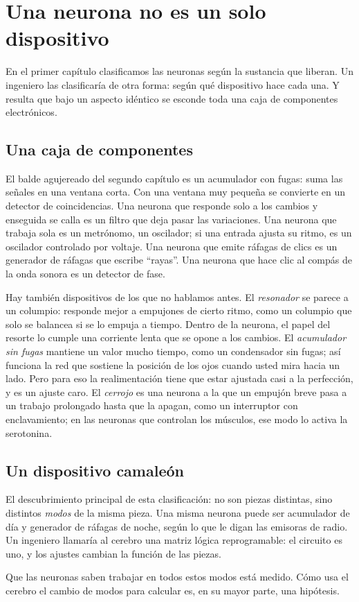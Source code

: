 \chapter{Una neurona no es un solo dispositivo}

En el primer capítulo clasificamos las neuronas según la sustancia que liberan. Un ingeniero las clasificaría de otra forma: según qué dispositivo hace cada una. Y resulta que bajo un aspecto idéntico se esconde toda una caja de componentes electrónicos.

\section*{Una caja de componentes}

El balde agujereado del segundo capítulo es un acumulador con fugas: suma las señales en una ventana corta. Con una ventana muy pequeña se convierte en un detector de coincidencias. Una neurona que responde solo a los cambios y enseguida se calla es un filtro que deja pasar las variaciones. Una neurona que trabaja sola es un metrónomo, un oscilador; si una entrada ajusta su ritmo, es un oscilador controlado por voltaje. Una neurona que emite ráfagas de clics es un generador de ráfagas que escribe “rayas”. Una neurona que hace clic al compás de la onda sonora es un detector de fase.


Hay también dispositivos de los que no hablamos antes. El \emph{resonador} se parece a un columpio: responde mejor a empujones de cierto ritmo, como un columpio que solo se balancea si se lo empuja a tiempo. Dentro de la neurona, el papel del resorte lo cumple una corriente lenta que se opone a los cambios. El \emph{acumulador sin fugas} mantiene un valor mucho tiempo, como un condensador sin fugas; así funciona la red que sostiene la posición de los ojos cuando usted mira hacia un lado. Pero para eso la realimentación tiene que estar ajustada casi a la perfección, y es un ajuste caro. El \emph{cerrojo} es una neurona a la que un empujón breve pasa a un trabajo prolongado hasta que la apagan, como un interruptor con enclavamiento; en las neuronas que controlan los músculos, ese modo lo activa la serotonina.

\section*{Un dispositivo camaleón}

El descubrimiento principal de esta clasificación: no son piezas distintas, sino distintos \emph{modos} de la misma pieza. Una misma neurona puede ser acumulador de día y generador de ráfagas de noche, según lo que le digan las emisoras de radio. Un ingeniero llamaría al cerebro una matriz lógica reprogramable: el circuito es uno, y los ajustes cambian la función de las piezas.

Que las neuronas saben trabajar en todos estos modos está medido. Cómo usa el cerebro el cambio de modos para calcular es, en su mayor parte, una hipótesis.

